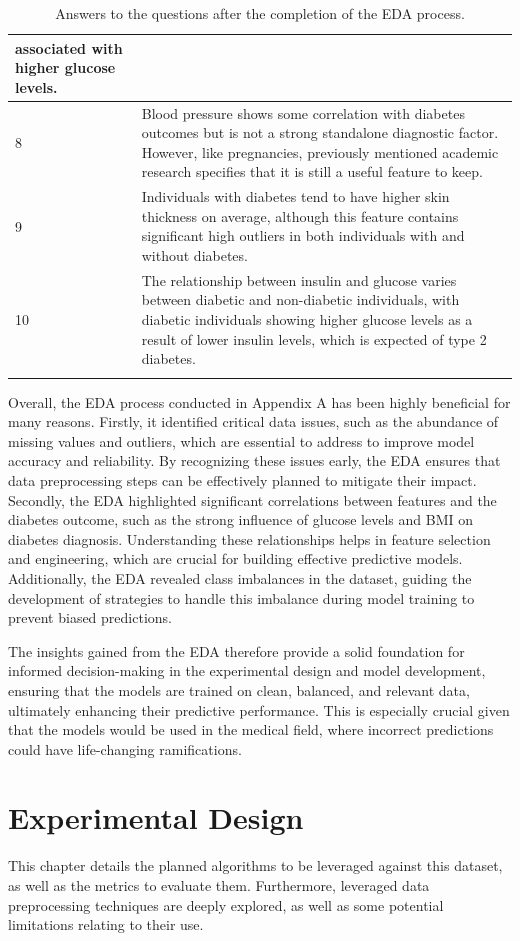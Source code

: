 \documentclass[12pt]{report}
\newcommand{\para}{\vspace{8pt}\noindent}
\begin{document}
\begin{longtable}{ | p{} | p{} | }
    associated with higher glucose levels.\\
    \hline
    8 & Blood pressure shows some correlation with diabetes outcomes but is not a strong standalone diagnostic factor. 
    However, like pregnancies, previously mentioned academic research specifies that it is still a useful feature to keep.\\
    \hline
    9 & Individuals with diabetes tend to have higher skin thickness on average, although this feature contains significant high outliers
    in both individuals with and without diabetes.\\
    \hline
    10 &  The relationship between insulin and glucose varies between diabetic and non-diabetic individuals, with diabetic individuals 
    showing higher glucose levels as a result of lower insulin levels, which is expected of type 2 diabetes.\\
    \hline
    \caption{Answers to the questions after the completion of the EDA process.}\label{tab:Answers}
\end{longtable}

\pagebreak
\para Overall, the EDA process conducted in Appendix A has been highly beneficial for many reasons. Firstly, it identified critical data issues, 
such as the abundance of missing values and outliers, which are essential to address to improve model accuracy and reliability. By recognizing these 
issues early, the EDA ensures that data preprocessing steps can be effectively planned to mitigate their impact. Secondly, the EDA highlighted significant
correlations between features and the diabetes outcome, such as the strong influence of glucose levels and BMI on diabetes diagnosis. Understanding these
relationships helps in feature selection and engineering, which are crucial for building effective predictive models. Additionally, the EDA revealed class 
imbalances in the dataset, guiding the development of strategies to handle this imbalance during model training to prevent biased predictions. 

\para The insights gained from the EDA therefore provide a solid foundation for informed decision-making in the experimental design and model development, 
ensuring that the models are trained on clean, balanced, and relevant data, ultimately enhancing their predictive performance. This is especially crucial 
given that the models would be used in the medical field, where incorrect predictions could have life-changing ramifications.

\chapter{Experimental Design} %
This chapter details the planned algorithms to be leveraged against this dataset,
as well as the metrics to evaluate them. Furthermore, leveraged data preprocessing techniques
are deeply explored, as well as some potential limitations relating to their use.
\end{document}
